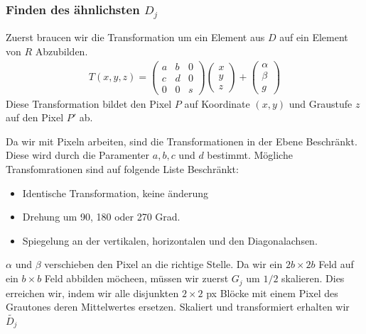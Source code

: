 \subsubsection{Finden des ähnlichsten $D_j$}
Zuerst braucen wir die Transformation um ein Element aus $D$ auf ein Element von $R$ Abzubilden.
\begin{align*}
	T(x,y,z) = 
	\begin{pmatrix}
		a & b & 0 \\
		c & d & 0 \\
		0 & 0 & s
	\end{pmatrix}
	\begin{pmatrix}
		x \\
		y \\
		z
	\end{pmatrix}
	+
	\begin{pmatrix}
		\alpha \\
		\beta \\
		g
	\end{pmatrix}
\end{align*}
Diese Transformation bildet den Pixel $P$ auf Koordinate $(x,y)$ und Graustufe $z$ auf den Pixel $P'$ ab.

Da wir mit Pixeln arbeiten, sind die Transformationen in der Ebene Beschränkt.
Diese wird durch die Paramenter $a,b,c$ und $d$ bestimmt.
Mögliche Transfomrationen sind auf folgende Liste Beschränkt:
\begin{itemize}
	\item Identische Transformation, keine änderung
	\item Drehung um 90, 180 oder 270 Grad.
	\item Spiegelung an der vertikalen, horizontalen und den Diagonalachsen.
\end{itemize}
$\alpha$ und $\beta$ verschieben den Pixel an die richtige Stelle.
Da wir ein $2b \times 2b$ Feld auf ein $b \times b$ Feld abbilden möcheen, müssen wir zuerst $G_j$ um $1/2$ skalieren.
Dies erreichen wir, indem wir alle disjunkten $2 \times 2$ px Blöcke mit einem Pixel des Grautones deren Mittelwertes ersetzen.
Skaliert und transformiert erhalten wir $\tilde{D_j}$

